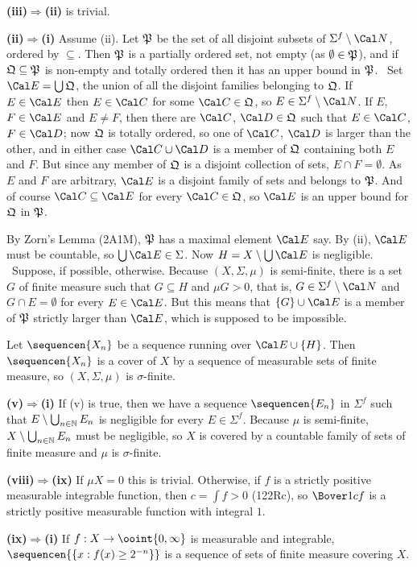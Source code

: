 {\medskip 
      
{\bf (iii)$\Rightarrow$(ii)} is trivial. 
      
\medskip 
      
{\bf (ii)$\Rightarrow$(i)} Assume (ii).   Let $\frak P$ be the set of 
all disjoint subsets of $\Sigma^f\setminus\Cal N$, ordered by 
$\subseteq$.   Then $\frak P$ is a partially ordered set, not empty (as 
$\emptyset\in \frak P$), and if $\frak Q\subseteq \frak P$ is non-empty 
and totally ordered then it has an upper bound in $\frak P$.   \Prf\ Set 
$\Cal E=\bigcup \frak Q$, the union of all the disjoint families 
belonging to $\frak Q$.   If $E\in\Cal E$ then $E\in\Cal C$ for some 
$\Cal C\in \frak Q$, so $E\in\Sigma^f\setminus\Cal N$.  If $E$, 
$F\in\Cal E$ and $E\ne F$, then there are $\Cal C$, $\Cal D\in \frak Q$ 
such that $E\in\Cal C$, $F\in\Cal D$;  now $\frak Q$ is totally ordered, 
so one of $\Cal C$, $\Cal D$ is larger than the other, and in either 
case $\Cal C\cup\Cal D$ is a member of $\frak Q$ containing both $E$ and 
$F$.   But since any member of $\frak Q$ is a disjoint collection of 
sets, $E\cap F=\emptyset$.   As $E$ and $F$ are arbitrary, $\Cal E$ is 
a disjoint family of sets and belongs to $\frak P$.   And of course 
$\Cal C\subseteq\Cal E$ for every $\Cal C\in \frak Q$, so $\Cal E$ is an 
upper bound for $\frak Q$ in $\frak P$.\ \Qed 
      
By Zorn's Lemma (2A1M), $\frak P$ has a maximal element $\Cal E$ say. 
By (ii), $\Cal E$ must be countable, so $\bigcup\Cal E\in\Sigma$.   Now 
$H=X\setminus\bigcup\Cal E$ is negligible.   \Prf\Quer\ Suppose, if 
possible, otherwise.   Because $(X,\Sigma,\mu)$ is semi-finite, there is 
a set $G$ of finite measure such that $G\subseteq H$ and $\mu G>0$, that 
is, $G\in\Sigma^f\setminus\Cal N$ and $G\cap E=\emptyset$ for every 
$E\in\Cal E$.  But this means that $\{G\}\cup\Cal E$ is a member of 
$\frak P$ strictly larger than $\Cal E$, which is supposed to be 
impossible.\ \Bang\Qed 
      
Let $\sequencen{X_n}$ be a sequence running over $\Cal E\cup\{H\}$. 
Then $\sequencen{X_n}$ is a cover of $X$ by a sequence of measurable 
sets of finite measure, so $(X,\Sigma,\mu)$ is $\sigma$-finite. 
      
\medskip 
      
{\bf (v)$\Rightarrow$(i)} If (v) is true, then we have a sequence 
$\sequencen{E_n}$ in $\Sigma^f$ such that 
$E\setminus\bigcup_{n\in\Bbb N}E_n$ is negligible for every 
$E\in\Sigma^f$.   Because $\mu$ is semi-finite, 
$X\setminus\bigcup_{n\in\Bbb N}E_n$ must be negligible, so $X$ is 
covered by a countable family of sets of finite measure and $\mu$ is 
$\sigma$-finite. 
      
\medskip 
      
{\bf (viii)$\Rightarrow$(ix)} If $\mu X=0$ this is trivial.   Otherwise, 
if $f$ is a strictly positive measurable integrable function, then 
$c=\int f>0$ (122Rc), so $\Bover1cf$ is a strictly positive measurable 
function with integral $1$. 
      
{\bf (ix)$\Rightarrow$(i)} If $f:X\to\ooint{0,\infty}$ is measurable and 
integrable, $\sequencen{\{x:f(x)\ge 2^{-n}\}}$ is a sequence of sets of 
finite measure covering $X$. 
}%
      
